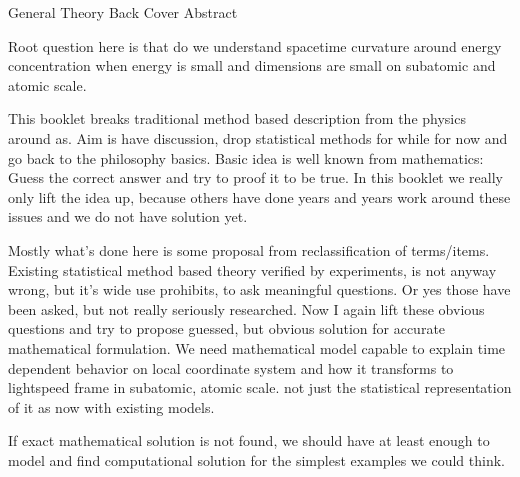 %
%
%
General Theory Back Cover Abstract\hfill
\label{abstract}


Root question here is that do we understand spacetime curvature around energy
concentration when energy is small and dimensions are small on subatomic and
atomic scale.

This booklet breaks traditional method based description from the physics
around as. Aim is have discussion, drop statistical methods for while for now
and go back to the philosophy basics. Basic idea is well known from
mathematics: Guess the correct answer and try to proof it to be true. In this
booklet we really only lift the idea up, because others have done years and
years work around these issues and we do not have solution yet.

Mostly what's done here is some proposal from reclassification of terms/items.
Existing statistical method based theory verified by experiments, is not
anyway wrong, but it's wide use prohibits, to ask meaningful questions. Or yes
those have been asked, but not really seriously researched. Now I again lift
these obvious questions and try to propose guessed, but obvious solution for
accurate mathematical formulation. We need mathematical model capable to
explain time dependent behavior on local coordinate system and how it
transforms to lightspeed frame in subatomic, atomic scale. not just the
statistical representation of it as now with existing models.

If exact mathematical solution is not found, we should have at least enough to
model and find computational solution for the simplest examples we could
think.
 
